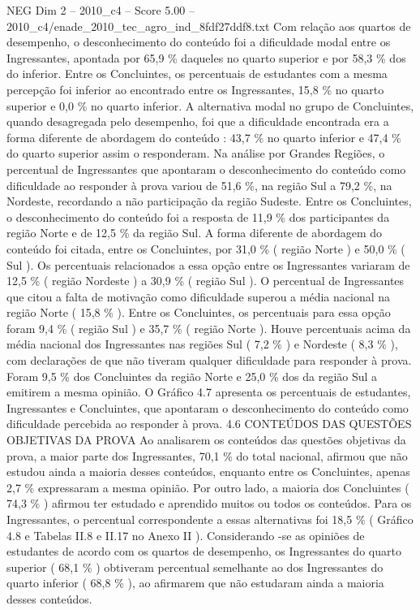\begin{textsample}{NEG Dim 2 – 2010\_c4 – Score 5.00 – 2010\_c4/enade\_2010\_tec\_agro\_ind\_8fdf27ddf8.txt}
Com relação aos quartos de desempenho, o desconhecimento do conteúdo foi a dificuldade modal entre os Ingressantes, apontada por 65,9 \% daqueles no quarto superior e por 58,3 \% dos do inferior.
Entre os Concluintes, os percentuais de estudantes com a mesma percepção foi inferior ao encontrado entre os Ingressantes, 15,8 \% no quarto superior e 0,0 \% no quarto inferior.
A alternativa modal no grupo de Concluintes, quando desagregada pelo desempenho, foi que a dificuldade encontrada era a forma diferente de abordagem do conteúdo : 43,7 \% no quarto inferior e 47,4 \% do quarto superior assim o responderam.
Na análise por Grandes Regiões, o percentual de Ingressantes que apontaram o desconhecimento do conteúdo como dificuldade ao responder à prova variou de 51,6 \%, na região Sul a 79,2 \%, na Nordeste, recordando a não participação da região Sudeste.
Entre os Concluintes, o desconhecimento do conteúdo foi a resposta de 11,9 \% dos participantes da região Norte e de 12,5 \% da região Sul.
A forma diferente de abordagem do conteúdo foi citada, entre os Concluintes, por 31,0 \% ( região Norte ) e 50,0 \% ( Sul ).
Os percentuais relacionados a essa opção entre os Ingressantes variaram de 12,5 \% ( região Nordeste ) a 30,9 \% ( região Sul ).
O percentual de Ingressantes que citou a falta de motivação como dificuldade superou a média nacional na região Norte ( 15,8 \% ).
Entre os Concluintes, os percentuais para essa opção foram 9,4 \% ( região Sul ) e 35,7 \% ( região Norte ).
Houve percentuais acima da média nacional dos Ingressantes nas regiões Sul ( 7,2 \% ) e Nordeste ( 8,3 \% ), com declarações de que não tiveram qualquer dificuldade para responder à prova.
Foram 9,5 \% dos Concluintes da região Norte e 25,0 \% dos da região Sul a emitirem a mesma opinião.
O Gráfico 4.7 apresenta os percentuais de estudantes, Ingressantes e Concluintes, que apontaram o desconhecimento do conteúdo como dificuldade percebida ao responder à prova. 4.6 CONTEÚDOS DAS QUESTÕES OBJETIVAS DA PROVA Ao analisarem os conteúdos das questões objetivas da prova, a maior parte dos Ingressantes, 70,1 \% do total nacional, afirmou que não estudou ainda a maioria desses conteúdos, enquanto entre os Concluintes, apenas 2,7 \% expressaram a mesma opinião.
Por outro lado, a maioria dos Concluintes ( 74,3 \% ) afirmou ter estudado e aprendido muitos ou todos os conteúdos.
Para os Ingressantes, o percentual correspondente a essas alternativas foi 18,5 \% ( Gráfico 4.8 e Tabelas II.8 e II.17 no Anexo II ).
Considerando -se as opiniões de estudantes de acordo com os quartos de desempenho, os Ingressantes do quarto superior ( 68,1 \% ) obtiveram percentual semelhante ao dos Ingressantes do quarto inferior ( 68,8 \% ), ao afirmarem que não estudaram ainda a maioria desses conteúdos.

\end{textsample}
